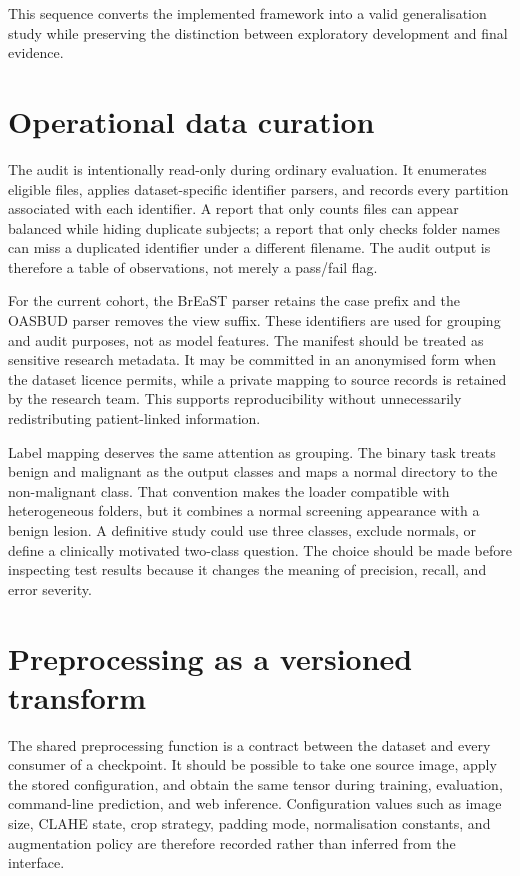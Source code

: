 This sequence converts the implemented framework into a valid generalisation study while preserving the distinction between exploratory development and final evidence.

\section{Operational data curation}
The audit is intentionally read-only during ordinary evaluation. It enumerates eligible files, applies dataset-specific identifier parsers, and records every partition associated with each identifier. A report that only counts files can appear balanced while hiding duplicate subjects; a report that only checks folder names can miss a duplicated identifier under a different filename. The audit output is therefore a table of observations, not merely a pass/fail flag.

For the current cohort, the BrEaST parser retains the case prefix and the OASBUD parser removes the view suffix. These identifiers are used for grouping and audit purposes, not as model features. The manifest should be treated as sensitive research metadata. It may be committed in an anonymised form when the dataset licence permits, while a private mapping to source records is retained by the research team. This supports reproducibility without unnecessarily redistributing patient-linked information.

Label mapping deserves the same attention as grouping. The binary task treats benign and malignant as the output classes and maps a normal directory to the non-malignant class. That convention makes the loader compatible with heterogeneous folders, but it combines a normal screening appearance with a benign lesion. A definitive study could use three classes, exclude normals, or define a clinically motivated two-class question. The choice should be made before inspecting test results because it changes the meaning of precision, recall, and error severity.

\section{Preprocessing as a versioned transform}
The shared preprocessing function is a contract between the dataset and every consumer of a checkpoint. It should be possible to take one source image, apply the stored configuration, and obtain the same tensor during training, evaluation, command-line prediction, and web inference. Configuration values such as image size, CLAHE state, crop strategy, padding mode, normalisation constants, and augmentation policy are therefore recorded rather than inferred from the interface.

